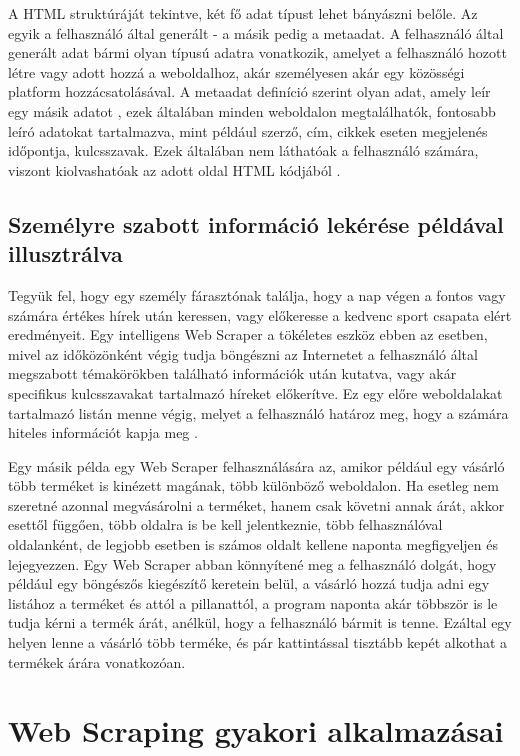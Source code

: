 A HTML struktúráját tekintve, két fő adat típust lehet bányászni belőle. Az egyik a felhasználó által generált - a másik pedig a metaadat. A felhasználó által generált adat bármi olyan típusú adatra vonatkozik, amelyet a felhasználó hozott létre vagy adott hozzá a weboldalhoz, akár személyesen akár egy közösségi platform hozzácsatolásával. A metaadat definíció szerint olyan adat, amely leír egy másik adatot \cite{landers2016primer}, ezek általában minden weboldalon megtalálhatók, fontosabb leíró adatokat tartalmazva, mint például szerző, cím, cikkek eseten megjelenés időpontja, kulcsszavak. Ezek általában nem láthatóak a felhasználó számára, viszont kiolvashatóak az adott oldal HTML kódjából \cite{landers2016primer}.

\subsection{Személyre szabott információ lekérése példával illusztrálva}

Tegyük fel, hogy egy személy fárasztónak találja, hogy a nap végen a fontos vagy számára értékes hírek után keressen, vagy előkeresse a kedvenc sport csapata elért eredményeit. Egy intelligens Web Scraper a tökéletes eszköz ebben az esetben, mivel az időközönként végig tudja böngészni az Internetet a felhasználó által megszabott témakörökben található információk után kutatva, vagy akár specifikus kulcsszavakat tartalmazó híreket előkerítve. Ez egy előre weboldalakat tartalmazó listán menne végig, melyet a felhasználó határoz meg, hogy a számára hiteles információt kapja meg \cite{dastidar2016intelligent}.

Egy másik példa egy Web Scraper felhasználására az, amikor például egy vásárló több terméket is kinézett magának, több különböző weboldalon. Ha esetleg nem szeretné azonnal megvásárolni a terméket, hanem csak követni annak árát, akkor esettől függően, több oldalra is be kell jelentkeznie, több felhasználóval oldalanként, de legjobb esetben is számos oldalt kellene naponta megfigyeljen és lejegyezzen. Egy Web Scraper abban könnyítené meg a felhasználó dolgát, hogy például egy böngészős kiegészítő keretein belül, a vásárló hozzá tudja adni egy listához a terméket és attól a pillanattól, a program naponta akár többször is le tudja kérni a termék árát, anélkül, hogy a felhasználó bármit is tenne. Ezáltal egy helyen lenne a vásárló több terméke, és pár kattintással tisztább kepét alkothat a termékek árára vonatkozóan.

\section{Web Scraping gyakori alkalmazásai}

